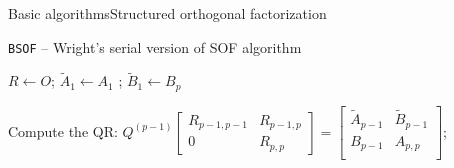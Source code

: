 \documentclass[xcolor=table,final]{beamer} %
\begin{document}
\begin{frame}{Basic algorithms}{Structured orthogonal factorization}
  \begin{block}{{\tt BSOF} -- Wright's serial version of SOF algorithm}
    \begin{algorithm}[H]%
      \BlankLine

      $R \gets O$; $\tilde{A}_1 \gets A_1$ ; $\tilde{B}_1 \gets B_p$\; 

      
      Compute the QR: 
      $Q^{(p-1)} 
      \begin{bmatrix}
        R_{p-1,p-1} & R_{p-1,p}\\
        0 & R_{p,p}
      \end{bmatrix}
      = \begin{bmatrix}
        \tilde{A}_{p-1} & \tilde{B}_{p-1}\\ 
              {B}_{p-1} & {A}_{p,p}\\ 
      \end{bmatrix}$;
    \end{algorithm}
  \end{block}
\end{frame}
\end{document}
